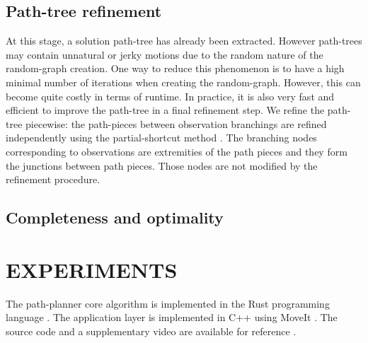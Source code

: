 \documentclass[letterpaper, 10 pt, conference]{ieeeconf}  %
\begin{document}
\subsection{Path-tree refinement}
At this stage, a solution path-tree has already been extracted. However path-trees may contain  unnatural or jerky motions due to the random nature of the random-graph creation. One way to reduce this phenomenon is to have a high minimal number of iterations when creating the random-graph. However, this can become quite costly in terms of runtime. In practice, it is also very fast and efficient to improve the path-tree in a final refinement step. We refine the path-tree piecewise: the path-pieces between observation branchings are refined independently using the partial-shortcut method \cite{geraerts2007creating}. The branching nodes corresponding to observations are extremities of the path pieces and they form the junctions between path pieces. Those nodes are not modified by the refinement procedure. 




\subsection{Completeness and optimality}


\section{EXPERIMENTS}
The path-planner core algorithm is implemented in the Rust programming language \cite{matsakis2014rust}. The application layer is implemented in C++ using MoveIt \cite{coleman2014reducing}. The source code and a supplementary video are available for reference \footnotemark {}. %
\end{document}
